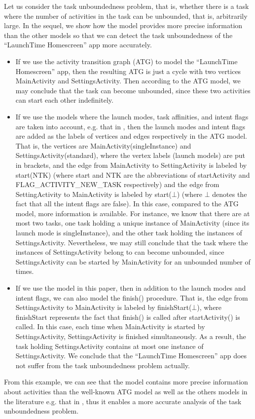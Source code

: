 
Let us consider the task unboundedness problem, that is, whether there is a task where the number of activities in the task can be unbounded, that is, arbitrarily large. In the sequel, we show how the {\AMASS} model provides more precise information than the other models so that we can detect the task unboundedness of  the ``LaunchTime Homescreen'' app more accurately. 
\begin{itemize}
\item If we use the activity transition graph (ATG) to model the ``LaunchTime Homescreen'' app, then the resulting ATG is just a cycle with two vertices MainActivity and SettingsActivity. Then according to the ATG model, we may conclude that the task can become unbounded, since these two activities can start each other indefinitely. 
%
\item If we use the models where the launch modes, task affinities, and intent flags are taken into account, e.g. that in \cite{LHR17}, then the launch modes and intent flags are added as the labels of vertices and edges respectively in the ATG model. That is, the vertices are MainActivity(singleInstance) and SettingsActivity(standard), where the vertex labels (launch models) are put in brackets, and the edge from MainActivity to SettingActivity is labeled by start(NTK) (where start and NTK are the abbreviations of startActivity and FLAG\_ACTIVITY\_NEW\_TASK respectively) and the edge from SettingActivity to MainActivity is labeled by start($\bot$) (where $\bot$ denotes the fact that all the intent flags are false). In this case, compared to the ATG model, more information is available. For instance, we know that there are at most two tasks, one task holding a unique instance of MainActivity (since its launch mode is singleInstance), and the other task holding the instances of SettingsActivity. Nevertheless, we may still conclude that the task where the instances of SettingsActivity belong to can become unbounded, since SettingsActivity can be started by MainActivity for an unbounded number of times. 
%
\item If we use the {\AMASS} model in this paper, then in addition to the launch modes and intent flags, we can also model the finish() procedure. That is, the edge from SettingsActivity to MainActivity is labeled by finishStart($\bot$), where finishStart represents the fact that finish() is called after startActivity() is called. In this case, each time when MainActivity is started by SettingsActivity, SettingsActivity is finished simultaneously. As a result, the task holding SettingsActivity contains at most one instance of SettingsActivity. We conclude that the ``LaunchTime Homescreen'' app does not suffer from the task unboundedness problem actually. 
\end{itemize}
From this example, we can see that the {\AMASS} model contains more precise information about activities than the well-known ATG model as well as the others models in the literature e.g. that in \cite{LHR17}, thus it enables a more accurate analysis of the task unboundedness problem. 

